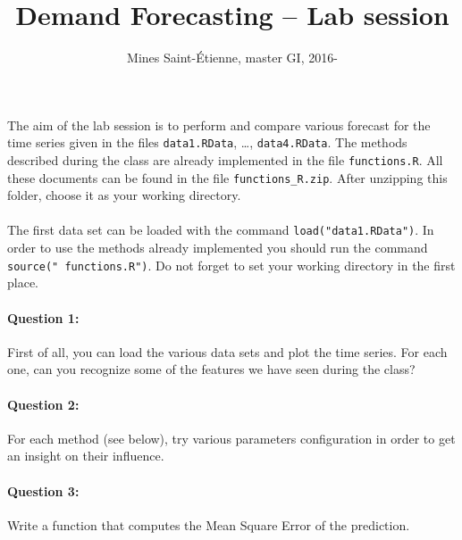 \documentclass[11pt]{scrartcl}
\title{Demand Forecasting -- Lab session}
\author{Mines Saint-\'Etienne, master GI,  2016\:-\:2017 }
\date{}
\begin{document}

\maketitle

\paragraph{}
The aim of the lab session is to perform and compare various forecast for the time series given in the files \verb!data1.RData!, \dots, \verb!data4.RData!. The methods described during the class are already implemented in the file \verb!functions.R!. All these documents can be found in the file \verb!functions_R.zip!. After unzipping this folder, choose it as your working directory.

\paragraph{}
The first data set can be loaded with the command \verb!load("data1.RData")!. In order to use the methods already implemented you should run the command \texttt{source(" functions.R")}. Do not forget to set your working directory in the first place.

\paragraph{Question 1: }
First of all, you can load the various data sets and plot the time series. For each one, can you recognize some of the features we have seen during the class?

\paragraph{Question 2: }
For each method (see below), try various parameters configuration in order to get an insight on their influence.

\paragraph{Question 3: }
Write a function that computes the Mean Square Error of the prediction.

\end{document}

